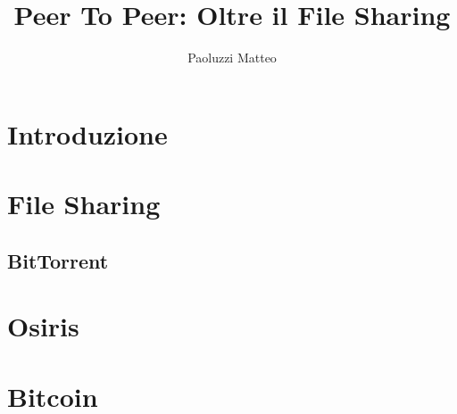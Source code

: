 \documentclass[10pt,a4paper,twoside,draft,titlepage]{book}
\author{Paoluzzi Matteo}
\title{Peer To Peer: Oltre il File Sharing}
\begin{document}
\part{Introduzione}
\part{File Sharing}
\chapter{BitTorrent}
\part{Osiris}
\part{Bitcoin}
\end{document}
